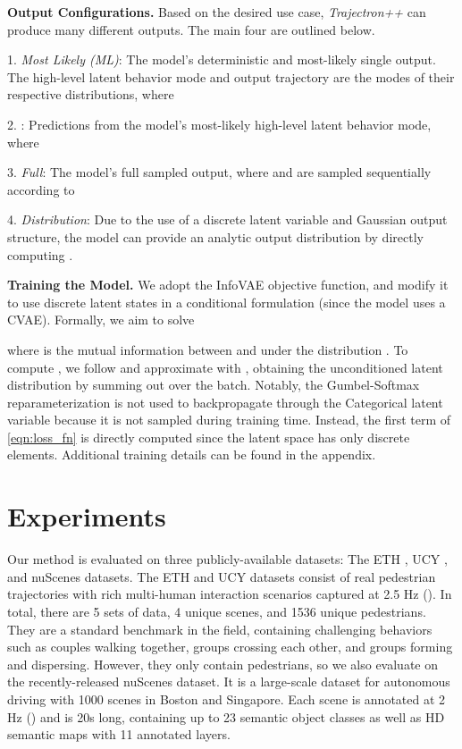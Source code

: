 \documentclass[runningheads]{llncs}
\newcommand{\algname}{\mbox{Trajectron++}}
\newcommand{\emphalgname}{\emph{\algname}}
\begin{document}
{\bf Output Configurations.} Based on the desired use case, \emphalgname{} can produce many different outputs. The main four are outlined below.


    1. \emph{Most Likely (ML)}: 
    The model's deterministic and most-likely single output.
The high-level latent behavior mode and output trajectory are the modes of their respective distributions, where
    
    
    2. : Predictions from the model's most-likely high-level latent behavior mode, where 
    
    
    3. \emph{Full}: The model's full sampled output, where  and  are sampled sequentially according to 
    
    
    4. \emph{Distribution}: Due to the use of a discrete latent variable and Gaussian output structure, the model can provide an analytic output distribution by directly computing .

{\bf Training the Model.} We adopt the InfoVAE \cite{ZhaoSongEtAl2019} objective function, and modify it to use discrete latent states in a conditional formulation (since the model uses a CVAE). Formally, we aim to solve

where  is the mutual information between  and  under the distribution . To compute , we follow \cite{ZhaoSongEtAl2019} and approximate  with \mbox{}, obtaining the unconditioned latent distribution by summing out  over the batch.
Notably, the Gumbel-Softmax reparameterization \cite{JangGuEtAl2017} is not used to backpropagate through the Categorical latent variable  because it is not sampled during training time. Instead, the first term of \cref{eqn:loss_fn} is directly computed since the latent space has only  discrete elements. Additional training details can be found in the appendix.








\section{Experiments}

Our method is evaluated on three publicly-available datasets: The ETH \cite{PellegriniEssEtAl2009}, UCY \cite{LernerChrysanthouEtAl2007}, and nuScenes \cite{CaesarBankitiEtAl2019} datasets. The ETH and UCY datasets consist of real pedestrian trajectories with rich multi-human interaction scenarios captured at 2.5 Hz (). In total, there are 5 sets of data, 4 unique scenes, and 1536 unique pedestrians. They are a standard benchmark in the field, containing challenging behaviors such as couples walking together, groups crossing each other, and groups forming and dispersing. However, they only contain pedestrians,
so we also evaluate on the recently-released nuScenes dataset. It is a large-scale dataset for autonomous driving with 1000 scenes in Boston and Singapore. Each scene is annotated at 2 Hz () and is 20s long, containing up to 23 semantic object classes as well as HD semantic maps with 11 annotated layers. 
\end{document}
